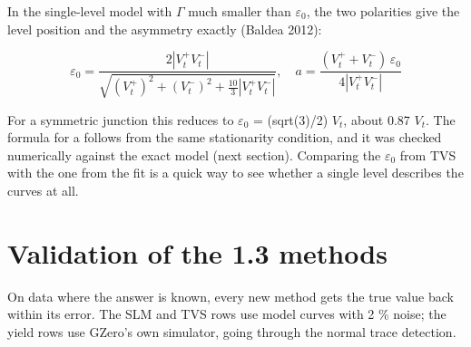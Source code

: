 \documentclass[
  11pt,
  a4paper,
]{article}
\begin{document}
In the single-level model with $\Gamma$ much smaller than
$\varepsilon_0$, the two polarities give the level position and the
asymmetry exactly (Baldea 2012):

\[
\varepsilon_0 = \frac{2|V_t^+ V_t^-|}{\sqrt{(V_t^+)^2 + (V_t^-)^2 + \frac{10}{3}|V_t^+ V_t^-|}}, \quad a = \frac{(V_t^+ + V_t^-)\,\varepsilon_0}{4|V_t^+ V_t^-|}
\]

For a symmetric junction this reduces to $\varepsilon_0$ = (sqrt(3)/2)
$V_t$, about 0.87 $V_t$. The formula for a follows from the same
stationarity condition, and it was checked numerically against the exact
model (next section). Comparing the $\varepsilon_0$ from TVS with the
one from the fit is a quick way to see whether a single level describes
the curves at all.

\hypertarget{validation-of-the-1.3-methods}{%
\section{Validation of the 1.3
methods}\label{validation-of-the-1.3-methods}}

On data where the answer is known, every new method gets the true value
back within its error. The SLM and TVS rows use model curves with 2 \%
noise; the yield rows use GZero's own simulator, going through the
normal trace detection.
\end{document}
